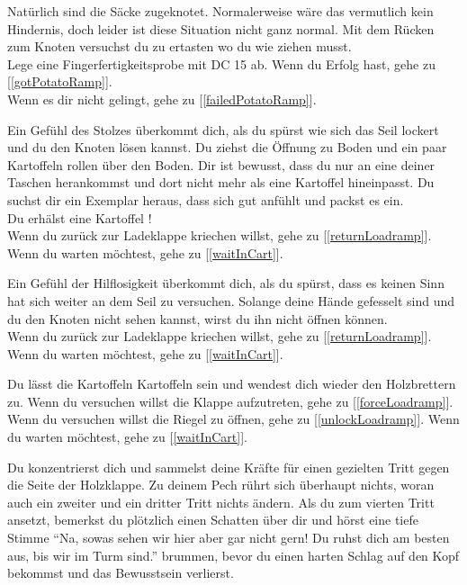 
Natürlich sind die Säcke zugeknotet. Normalerweise wäre das vermutlich kein Hindernis, doch leider ist diese Situation nicht ganz normal. Mit dem Rücken zum Knoten versuchst du zu ertasten wo du wie ziehen musst.
\\Lege eine Fingerfertigkeitsprobe mit DC 15 ab. Wenn du Erfolg hast, gehe zu [\ref{gotPotatoRamp}].
\\Wenn es dir nicht gelingt, gehe zu [\ref{failedPotatoRamp}].


Ein Gefühl des Stolzes überkommt dich, als du spürst wie sich das Seil lockert und du den Knoten lösen kannst. Du ziehst die Öffnung zu Boden und ein paar Kartoffeln rollen über den Boden. Dir ist bewusst, dass du nur an eine deiner Taschen herankommst und dort nicht mehr als eine Kartoffel hineinpasst. Du suchst dir ein Exemplar heraus, dass sich gut anfühlt und packst es ein.
\\Du erhälst eine Kartoffel !
\\Wenn du zurück zur Ladeklappe kriechen willst, gehe zu [\ref{returnLoadramp}].
\\Wenn du warten möchtest, gehe zu [\ref{waitInCart}].


Ein Gefühl der Hilflosigkeit überkommt dich, als du spürst, dass es keinen Sinn hat sich weiter an dem Seil zu versuchen. Solange deine Hände gefesselt sind und du den Knoten nicht sehen kannst, wirst du ihn nicht öffnen können.
\\Wenn du zurück zur Ladeklappe kriechen willst, gehe zu [\ref{returnLoadramp}].
\\Wenn du warten möchtest, gehe zu [\ref{waitInCart}].


Du lässt die Kartoffeln Kartoffeln sein und wendest dich wieder den Holzbrettern zu.
Wenn du versuchen willst die Klappe aufzutreten, gehe zu [\ref{forceLoadramp}].
Wenn du versuchen willst die Riegel zu öffnen, gehe zu [\ref{unlockLoadramp}].
Wenn du warten möchtest, gehe zu [\ref{waitInCart}].


Du konzentrierst dich und sammelst deine Kräfte für einen gezielten Tritt gegen die Seite der Holzklappe. Zu deinem Pech rührt sich überhaupt nichts, woran auch ein zweiter und ein dritter Tritt nichts ändern. Als du zum vierten Tritt ansetzt, bemerkst du plötzlich einen Schatten über dir und hörst eine tiefe Stimme ``Na, sowas sehen wir hier aber gar nicht gern! Du ruhst dich am besten aus, bis wir im Turm sind.'' brummen, bevor du einen harten Schlag auf den Kopf bekommst und das Bewusstsein verlierst.

